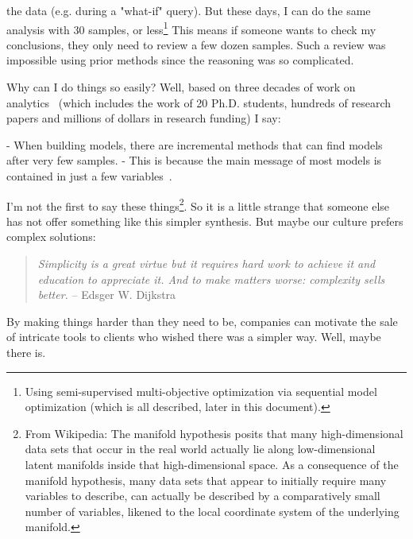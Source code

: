 \documentclass[landscape,	DIV=calc,%
							paper=letter,%
							fontsize=10pt,%
							twocolumn]{scrartcl}	 					%
\begin{document}
 
the data (e.g. during a "what-if" query).  But these days, I can
do the same analysis with 30 samples, or 
less\footnote{Using semi-supervised multi-objective optimization via
sequential model optimization (which is all described, later in
this document).} 
This means
if someone wants to check my conclusions, they only need to review
a few dozen samples.  Such a review was impossible using prior
methods since the reasoning was so complicated.


Why can I do things so easily? Well,  based on three decades of work
on analytics~\cite{menzies1988combining} (which includes the work of 20 Ph.D. students,
hundreds of research papers and millions of dollars in research
funding) I say:

- When building models, there are incremental methods that can find
models after very few samples.
- This is because the main message of most models is contained in
just a few variables~\cite{menzies1988combining}.

I'm not the first to say these things\footnote{
From Wikipedia: The manifold hypothesis posits that many
high-dimensional data sets that occur in the real world actually
lie along low-dimensional latent manifolds inside that high-dimensional
space. As a consequence of the manifold hypothesis, many data sets
that appear to initially require many variables to describe, can
actually be described by a comparatively small number of variables,
likened to the local coordinate system of the underlying manifold.}.
So it is a little
strange that someone else has not offer something like this simpler
synthesis. But maybe our culture prefers complex solutions:

\begin{quote}{\em Simplicity is a great virtue but it requires hard work to achieve
it and education to appreciate it. And to make matters worse:
complexity sells better.}\newline
-- Edsger W. Dijkstra
\end{quote}

By making things harder than they need to be, companies can motivate
the sale  of intricate tools to clients who wished there was a
simpler way. Well, maybe there is.
\end{document}
